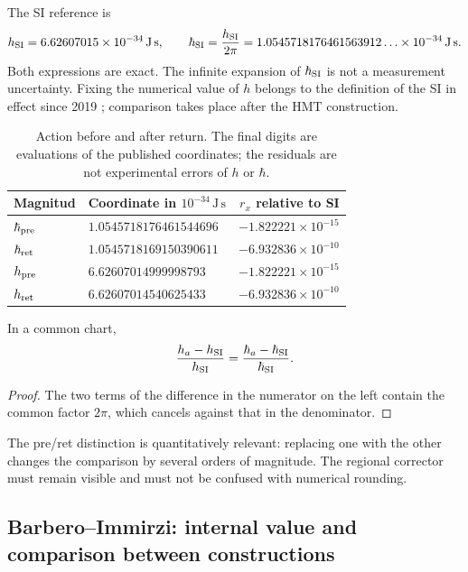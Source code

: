 The SI reference is
\[
 h_{\rm SI}=6.62607015\times10^{-34}\,\mathrm{J\,s},\qquad
 \hbar_{\rm SI}=\frac{h_{\rm SI}}{2\pi}
 =1.0545718176461563912\ldots\times10^{-34}\,\mathrm{J\,s}.
\]
Both expressions are exact. The infinite expansion of \(\hbar_{\rm SI}\)
is not a measurement uncertainty. Fixing the numerical value of
\(h\) belongs to the definition of the SI in effect since 2019
\cite{ii:bipm2018}; comparison takes place after the HMT construction.

\begin{table}[htbp]
\centering\small
\setlength{\tabcolsep}{5pt}
\begin{tabular}{@{}llr@{}}
\toprule
Magnitud & Coordinate in \(10^{-34}\,\mathrm{J\,s}\) & \(r_x\) relative to SI\\
\midrule
\(\hbar_{\rm pre}\) & \(1.0545718176461544696\) & \(-1.822221\times10^{-15}\)\\
\(\hbar_{\rm ret}\) & \(1.0545718169150390611\) & \(-6.932836\times10^{-10}\)\\
\(h_{\rm pre}\) & \(6.62607014999998793\) & \(-1.822221\times10^{-15}\)\\
\(h_{\rm ret}\) & \(6.62607014540625433\) & \(-6.932836\times10^{-10}\)\\
\bottomrule
\end{tabular}
\caption{Action before and after return. The final digits are
evaluations of the published coordinates; the residuals are not experimental
errors of \(h\) or \(\hbar\).}
\label{ii:tab:ii-planck-comparacion}
\end{table}

\begin{proposition}
In a common chart,
\[
 \frac{h_a-h_{\rm SI}}{h_{\rm SI}}
 =\frac{\hbar_a-\hbar_{\rm SI}}{\hbar_{\rm SI}}.
\]
\end{proposition}
\begin{proof}
The two terms of the difference in the numerator on the left contain the common factor
\(2\pi\), which cancels against that in the denominator.
\end{proof}
The pre/ret distinction is quantitatively relevant: replacing one with
the other changes the comparison by several orders of magnitude. The regional
corrector must remain visible and must not be confused with numerical rounding.

\subsection{Barbero--Immirzi: internal value and comparison between constructions}

